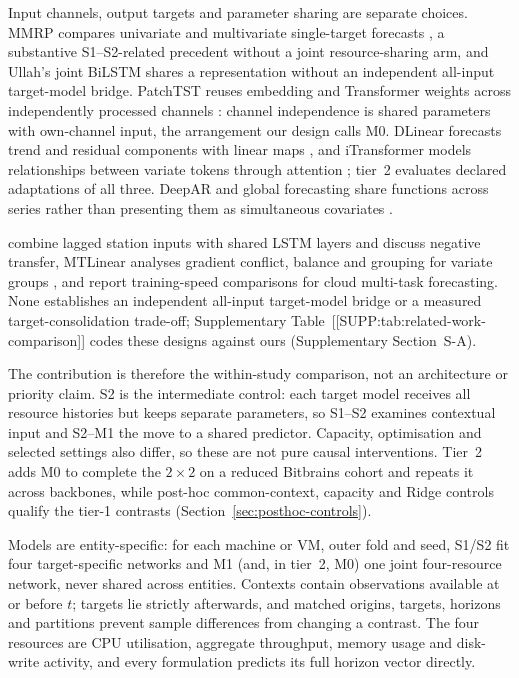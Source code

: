 Input channels, output targets and parameter sharing are separate choices.
MMRP compares univariate and multivariate single-target forecasts
\citep{Tripathi2025MMRP}, a substantive S1--S2-related precedent without a
joint resource-sharing arm, and Ullah's joint BiLSTM shares a representation
without an independent all-input target-model bridge. PatchTST reuses
embedding and Transformer weights across independently processed channels
\citep{Nie2023PatchTST}: channel independence is shared parameters with
own-channel input, the arrangement our design calls M0. DLinear forecasts
trend and residual components with linear maps \citep{Zeng2023DLinear}, and
iTransformer models relationships between variate tokens through attention
\citep{Liu2024iTransformer}; tier~2 evaluates declared adaptations of all
three. DeepAR and global forecasting share functions across series rather
than presenting them as simultaneous covariates
\citep{Salinas2020DeepAR,MonteroManso2021GlobalForecasting}.


\citet{Nikentari2022NARMAXLSTM} combine lagged station inputs with shared LSTM
layers and discuss negative transfer, MTLinear analyses gradient conflict,
balance and grouping for variate groups \citep{Nochumsohn2025MTLinear}, and
\citet{Bi2019CloudMultitask} report training-speed comparisons for cloud
multi-task forecasting. None establishes an independent all-input
target-model bridge or a measured target-consolidation trade-off;
Supplementary Table~[[SUPP:tab:related-work-comparison]] codes these designs
against ours (Supplementary Section~S-A).

The contribution is therefore the within-study comparison, not an
architecture or priority claim. S2 is the intermediate control: each target
model receives all resource histories but keeps separate parameters, so S1--S2
examines contextual input and S2--M1 the move to a shared predictor.
Capacity, optimisation and selected settings also differ, so these are not
pure causal interventions. Tier~2 adds M0 to complete the $2\times2$ on a
reduced Bitbrains cohort and repeats it across backbones, while post-hoc
common-context, capacity and Ridge controls qualify the tier-1 contrasts
(Section~\ref{sec:posthoc-controls}).


Models are entity-specific: for each machine or VM, outer fold and seed, S1/S2
fit four target-specific networks and M1 (and, in tier~2, M0) one joint
four-resource network, never shared across entities. Contexts contain
observations available at or before $t$; targets lie strictly afterwards, and
matched origins, targets, horizons and partitions prevent sample differences
from changing a contrast. The four resources are CPU utilisation, aggregate
throughput, memory usage and disk-write activity, and every formulation
predicts its full horizon vector directly.

